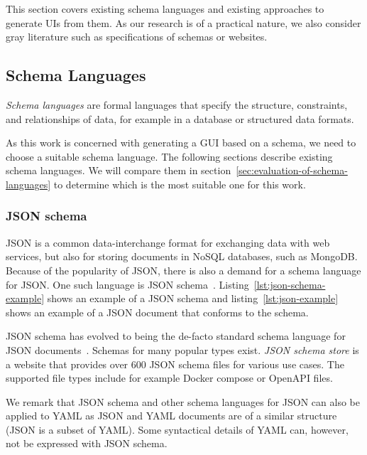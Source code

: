 
This section covers existing schema languages and existing approaches to generate UIs from them.
As our research is of a practical nature, we also consider gray literature such as specifications of schemas or websites.
\subsection{Schema Languages}\label{subsec:schemalanguages}

\textit{Schema languages} are formal languages that specify the structure, constraints, and relationships of data, for example in a database or structured data formats.

As this work is concerned with generating a GUI based on a schema, we need to choose a suitable schema language.
The following sections describe existing schema languages.
We will compare them in section~\ref{sec:evaluation-of-schema-languages} to determine which is the most suitable one for this work.

\subsubsection{JSON schema}

JSON is a common data-interchange format for exchanging data with web services, but also for storing documents in NoSQL databases, such as MongoDB\@\cite{marrs2017json}.
Because of the popularity of JSON, there is also a demand for a schema language for JSON\@.
One such language is JSON schema~\cite{jsonSchema, jsonschemaJSONSchema}.
Listing~\ref{lst:json-schema-example} shows an example of a JSON schema and listing~\ref{lst:json-example} shows an example of a JSON document that conforms to the schema.

JSON schema has evolved to being the de-facto standard schema language for JSON documents~\cite{baazizi2021empirical}.
Schemas for many popular \cfgfile{} types exist.
\textit{JSON schema store}\cite{schemastoreJSONSchema} is a website that provides over 600 JSON schema files for various use cases.
The supported file types include for example Docker compose or OpenAPI files.

We remark that JSON schema and other schema languages for JSON can also be applied to YAML as JSON and YAML documents are of a similar structure (JSON is a subset of YAML).
Some syntactical details of YAML can, however, not be expressed with JSON schema.

